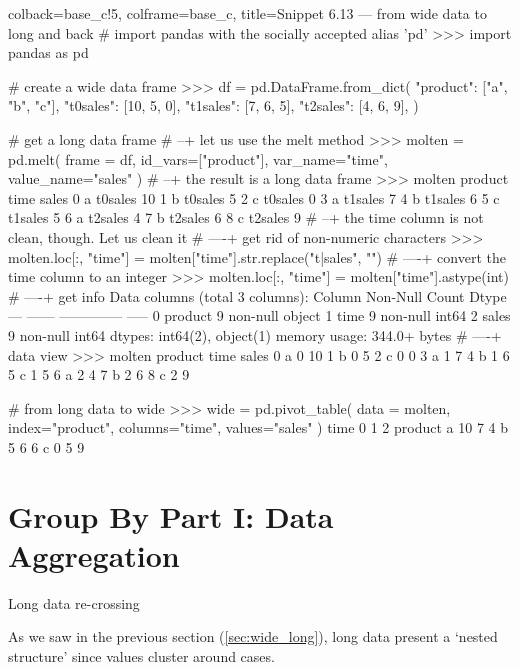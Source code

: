 \documentclass[a4paper,11pt]{book}
\numberwithin{figure}{chapter}
\numberwithin{table}{chapter}
\newcommand{\question}[1]{%
    \begin{tcolorbox}[colback=comp_c!10,colframe=comp_c,sidebyside align=top,width=\linewidth,before skip=1ex]
        #1
    \end{tcolorbox}
    \switchcolumn%
}
\newcommand{\note}[1]{%
    \begin{tcolorbox}[colback=white!0,colframe=white!10,width=\linewidth,before skip=1ex]
        #1
    \end{tcolorbox}
}
\begin{document}
\begin{pythoncode}[linenos=True]{colback=base_c!5, colframe=base_c, title=\sffamily Snippet 6.13 --- from wide data to long and back}
# import pandas with the socially accepted alias 'pd'
>>> import pandas as pd

# create a wide data frame
>>> df = pd.DataFrame.from_dict(
        {
            "product": ["a", "b", "c"],
            "t0sales": [10, 5, 0],
            "t1sales": [7, 6, 5],
            "t2sales": [4, 6, 9],
        }
    )

# get a long data frame
# --+ let us use the melt method 
>>> molten = pd.melt(
	frame = df, id_vars=["product"], var_name="time", value_name="sales"
    )
# --+ the result is a long data frame
>>> molten
  product     time  sales
0       a  t0sales     10
1       b  t0sales      5
2       c  t0sales      0
3       a  t1sales      7
4       b  t1sales      6
5       c  t1sales      5
6       a  t2sales      4
7       b  t2sales      6
8       c  t2sales      9
# --+ the time column is not clean, though. Let us clean it
# ----+ get rid of non-numeric characters
>>> molten.loc[:, "time"] = molten["time"].str.replace("t|sales", "")
# ----+ convert the time column to an integer
>>> molten.loc[:, "time"] = molten["time"].astype(int)
# ----+ get info
Data columns (total 3 columns):
     Column   Non-Null Count  Dtype 
---  ------   --------------  ----- 
 0   product  9 non-null      object
 1   time     9 non-null      int64 
 2   sales    9 non-null      int64 
dtypes: int64(2), object(1)
memory usage: 344.0+ bytes
# ----+ data view
>>> molten
  product  time  sales
0       a     0     10
1       b     0      5
2       c     0      0
3       a     1      7
4       b     1      6
5       c     1      5
6       a     2      4
7       b     2      6
8       c     2      9

# from long data to wide 
>>> wide = pd.pivot_table(
	data = molten, index="product", columns="time", values="sales"
    )
time      0  1  2
product          
a        10  7  4
b         5  6  6
c         0  5  9
\end{pythoncode}
\clearpage
\section{Group By Part I: Data Aggregation}
\label{sec:groupby_aggr}

\begin{paracol}{2}
	\question{\raggedright Long data re-crossing}
	\note{As we saw in the previous section (\ref{sec:wide_long}), long data present a `nested structure' since values cluster around cases.}
\end{paracol}
\end{document}
